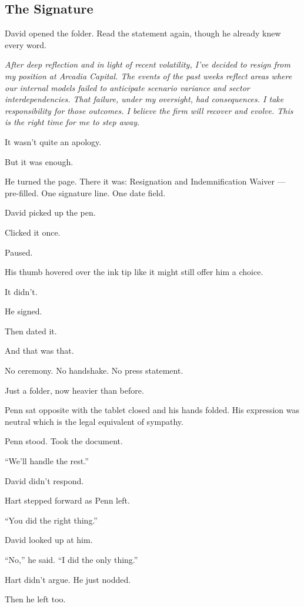 
\subsection{The Signature}

David opened the folder. Read the statement again, though he already knew every word.

\textit{After deep reflection and in light of recent volatility, I’ve decided to resign from my 
position at Arcadia Capital. The events of the past weeks reflect areas where our internal models 
failed to anticipate scenario variance and sector interdependencies. That failure, under my 
oversight, had consequences. I take responsibility for those outcomes. I believe the firm will 
recover and evolve. This is the right time for me to step away.}

It wasn’t quite an apology.

But it was enough.

He turned the page. There it was:
Resignation and Indemnification Waiver — pre-filled. One signature line. One date field.

David picked up the pen.

Clicked it once.

Paused.

His thumb hovered over the ink tip like it might still offer him a choice.

It didn’t.

He signed.

Then dated it.

And that was that.

No ceremony. No handshake. No press statement.

Just a folder, now heavier than before.

Penn sat opposite with the tablet closed and his hands folded. 
His expression was neutral which is the legal equivalent of sympathy.

Penn stood. Took the document.

``We’ll handle the rest.''

David didn’t respond.

Hart stepped forward as Penn left.

``You did the right thing.''

David looked up at him.

``No,'' he said. ``I did the only thing.''

Hart didn’t argue. He just nodded.

Then he left too.

